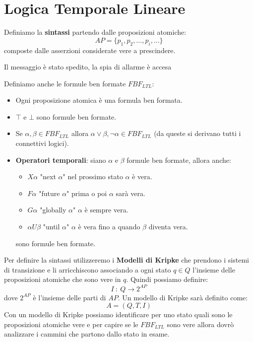 \section{Logica Temporale Lineare}
Definiamo la \textbf{sintassi} partendo dalle proposizioni atomiche:
\begin{equation}
    AP = \{p_1, p_2, \dots, p_i, \dots\}
\end{equation}
composte dalle asserzioni considerate vere a prescindere.
\begin{esempio}
    Il messaggio è stato spedito, la spia di allarme è accesa
\end{esempio}
Definiamo anche le formule ben formate $FBF_{LTL}$:
\begin{itemize}
    \item Ogni proposizione atomica è una formula ben formata.
    \item $\top$ e $\bot$ sono formule ben formate.
    \item Se $\alpha, \beta \in FBF_{LTL}$ allora $\alpha \lor \beta, \lnot
              \alpha \in FBF_{LTL}$ (da queste si derivano tutti i connettivi
          logici).
    \item \textbf{Operatori temporali}: siano $\alpha$ e $\beta$ formule ben
          formate, allora anche:
          \begin{itemize}
              \item $X\alpha$ "next $\alpha$" nel prossimo stato $\alpha$ è vera.
              \item $F\alpha$ "future $\alpha$" prima o poi $\alpha$ sarà vera.
              \item $G\alpha$ "globally $\alpha$" $\alpha$ è sempre vera.
              \item $\alpha U \beta$ "until $\alpha$" $\alpha$ è vera fino
                    a quando $\beta$ diventa vera.
          \end{itemize}
          sono formule ben formate.
\end{itemize}
Per definire la sintassi utilizzeremo i \textbf{Modelli di Kripke} che prendono
i sistemi di transizione e li arricchiscono associando a ogni stato $q \in Q$
l'insieme delle proposizioni atomiche che sono vere in $q$. Quindi possiamo
definire:
\begin{equation}
    I \ : \ Q \to 2^{AP}
\end{equation}
dove $2^{AP}$ è l'insieme delle parti di $AP$. Un modello di Kripke sarà
definito come:
\begin{equation}
    A = (Q, T, I)
\end{equation}
Con un modello di Kripke possiamo identificare per uno stato quali sono le
proposizioni atomiche vere e per capire se le $FBF_{LTL}$ sono vere allora dovrò
analizzare i cammini che partono dallo stato in esame.

